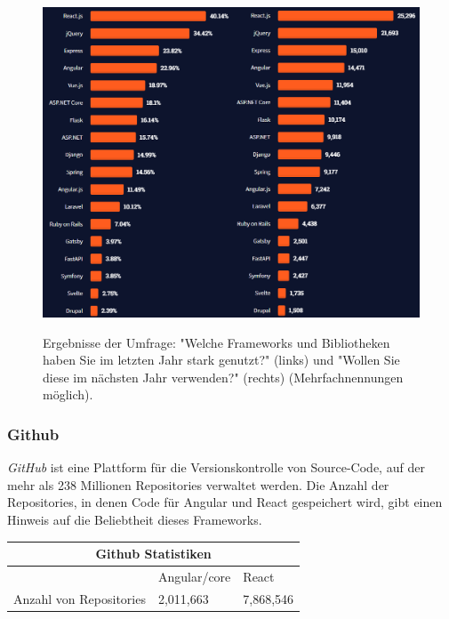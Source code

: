   \begin{figure}[h!]
    \centering
    \includegraphics[scale=0.5]{sources/Most_popular_Web_Frameworks_2021}
    \caption[Most popular Web Frameworks 2021]{}
    \label{fig:Most_popular_Web_Frameworks_2021} 
    Ergebnisse der Umfrage: "Welche Frameworks und Bibliotheken haben Sie im letzten Jahr stark genutzt?" (links) und "Wollen Sie diese im nächsten Jahr verwenden?" (rechts) (Mehrfachnennungen möglich)\cite{SO01}.
  \end{figure}

\subsubsection*{Github}
\textit{GitHub} ist eine Plattform für die Versionskontrolle von Source-Code, auf der mehr als 238 Millionen Repositories verwaltet werden{\cite{GH07}}.
Die Anzahl der Repositories, in denen Code für Angular und React gespeichert wird, gibt einen Hinweis auf die Beliebtheit dieses Frameworks.
\\
\begin{table}[h!]
  \centering
  \begin{tabular}{ |p{5cm}||p{3.6cm}|p{3.6cm}|  }
    \hline
    \multicolumn{3}{|c|}{Github Statistiken}\\
    \hline
    & Angular/core  {\cite{GH04}}& React {\cite{GH06}}\\
    \hline
    Anzahl von Repositories & 2,011,663& 7,868,546
    \\
    \hline
  \end{tabular}
\end{table}

